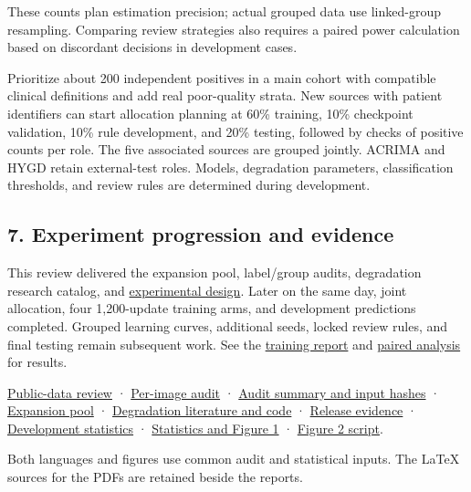\documentclass[
  10pt,
]{article}
\begin{document}
These counts plan estimation precision; actual grouped data use
linked-group resampling. Comparing review strategies also requires a
paired power calculation based on discordant decisions in development
cases.

Prioritize about 200 independent positives in a main cohort with
compatible clinical definitions and add real poor-quality strata. New
sources with patient identifiers can start allocation planning at 60\%
training, 10\% checkpoint validation, 10\% rule development, and 20\%
testing, followed by checks of positive counts per role. The five
associated sources are grouped jointly. ACRIMA and HYGD retain
external-test roles. Models, degradation parameters, classification
thresholds, and review rules are determined during development.

\subsection{7. Experiment progression and
evidence}\label{experiment-progression-and-evidence}

This review delivered the expansion pool, label/group audits,
degradation research catalog, and
\href{experiment-proposal.json}{experimental design}. Later on the same
day, joint allocation, four 1,200-update training arms, and development
predictions completed. Grouped learning curves, additional seeds, locked
review rules, and final testing remain subsequent work. See the
\href{../training-results/training-results.en.md}{training report} and
\href{../experimental-analysis/experimental-analysis.en.md}{paired
analysis} for results.

\href{../../../../data/audit/data_expansion_20261113/public_dataset_review.md}{Public-data
review} ·
\href{../../../../data/audit/data_expansion_20261113/local_decisions.csv}{Per-image
audit} ·
\href{../../../../data/audit/data_expansion_20261113/local_summary.json}{Audit
summary and input hashes} ·
\href{../../../../data/prepared/expansion_20261113/README.en.md}{Expansion
pool} ·
\href{../../../../data/audit/data_expansion_20261113/degradation_review.md}{Degradation
literature and code} ·
\href{../../../../data/audit/data_expansion_20261113/degradation_sources.json}{Release
evidence} · \href{development_analysis.json}{Development statistics} ·
\href{analyze_splits.py}{Statistics and Figure 1} ·
\href{plot_admission.py}{Figure 2 script}.

Both languages and figures use common audit and statistical inputs. The
LaTeX sources for the PDFs are retained beside the reports.
\end{document}
